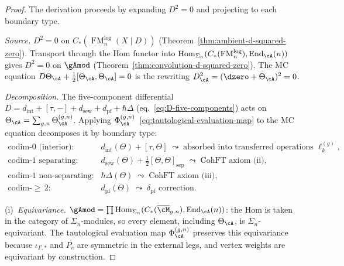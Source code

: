 \begin{proof}
The derivation proceeds by expanding $D^2 = 0$ and
projecting to each boundary type.

\smallskip\noindent
\emph{Source.}
$D^2 = 0$ on $C_*(\operatorname{FM}_n^{\mathrm{log}}(X \mathbin{|} D))$
(Theorem~\ref{thm:ambient-d-squared-zero}).
Transport through the Hom functor into
$\operatorname{Hom}_{\Sigma_n}(C_*(\operatorname{FM}_n^{\mathrm{log}}),
\operatorname{End}_\cA(n))$
gives $D^2 = 0$ on $\gAmod$
(Theorem~\ref{thm:convolution-d-squared-zero}).
The MC equation $D\Theta_\cA + \tfrac{1}{2}[\Theta_\cA,\Theta_\cA]
= 0$ is the rewriting $D_\cA^2 = (\dzero + \Theta_\cA)^2 = 0$.

\smallskip\noindent
\emph{Decomposition.}
The five-component differential $D = d_{\mathrm{int}} +
[\tau,-] + d_{\mathrm{sew}} + d_{\mathrm{pf}} + \hbar\Delta$
(eq.~\eqref{eq:D-five-components}) acts on
$\Theta_\cA = \sum_{g,n} \Theta_\cA^{(g,n)}$.
Applying $\Phi_\cA^{(g,n)}$~\eqref{eq:tautological-evaluation-map}
to the MC equation decomposes it by boundary type:
\begin{align*}
\text{codim-$0$ (interior):}&\quad
  d_{\mathrm{int}}(\Theta) + [\tau,\Theta]
  \;\leadsto\;
  \text{absorbed into transferred operations } \ell_k^{(g)},
\\
\text{codim-$1$ separating:}&\quad
  d_{\mathrm{sew}}(\Theta) + \tfrac{1}{2}[\Theta,\Theta]_{\mathrm{sep}}
  \;\leadsto\;
  \text{CohFT axiom (ii)},
\\
\text{codim-$1$ non-separating:}&\quad
  \hbar\Delta(\Theta)
  \;\leadsto\;
  \text{CohFT axiom (iii)},
\\
\text{codim-${\geq}\,2$:}&\quad
  d_{\mathrm{pf}}(\Theta)
  \;\leadsto\;
  \delta_{\mathrm{pf}}\text{ correction.}
\end{align*}

\smallskip\noindent
(i)~\emph{Equivariance.}
$\gAmod = \prod \operatorname{Hom}_{\Sigma_n}(C_*(\overline{\cM}_{g,n}),
\operatorname{End}_\cA(n))$: the Hom is taken in the category of
$\Sigma_n$-modules, so every element, including $\Theta_\cA$, is
$\Sigma_n$-equivariant.  The tautological evaluation map
$\Phi_\cA^{(g,n)}$ preserves this equivariance because
$\iota_{\Gamma,*}$ and $P_e$ are symmetric in the external legs, and
vertex weights are equivariant by construction.


\end{proof}
